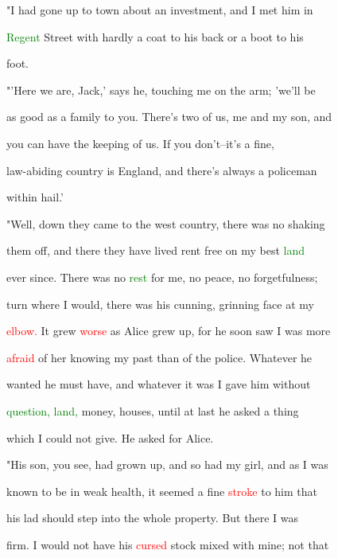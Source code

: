  "I had gone up to town about an investment, and I met him in

 \textcolor{green}{Regent} Street with hardly a coat to his back or a boot to his

 foot.



 "'Here we are, Jack,' says he, touching me on the arm; 'we'll be

 as \textcolor{BurntOrange}{good} as a family to you. There's two of us, me and my son, and

 you can have the keeping of us. If you don't--it's a fine,

 law-abiding country is England, and there's always a \textcolor{BurntOrange}{policeman}

 within \textcolor{BurntOrange}{hail.'}



 "Well, down they came to the west country, there was no shaking

 them off, and there they have lived rent free on my best \textcolor{green}{land}

 ever since. There was no \textcolor{green}{rest} for me, no \textcolor{BurntOrange}{peace,} no forgetfulness;

 turn where I would, there was his \textcolor{BurntOrange}{cunning,} \textcolor{BurntOrange}{grinning} face at my

 \textcolor{red}{elbow.} It \textcolor{BurntOrange}{grew} \textcolor{red}{worse} as Alice \textcolor{BurntOrange}{grew} up, for he soon saw I was more

 \textcolor{red}{afraid} of her knowing my past than of the \textcolor{BurntOrange}{police.} Whatever he

 wanted he must have, and whatever it was I gave him without

 \textcolor{green}{question,} \textcolor{green}{land,} \textcolor{BurntOrange}{money,} houses, until at last he asked a thing

 which I could not give. He asked for Alice.



 "His son, you see, had grown up, and so had my girl, and as I was

 known to be in weak health, it seemed a fine \textcolor{red}{stroke} to him that

 his lad should step into the whole property. But there I was

 firm. I would not have his \textcolor{red}{cursed} stock mixed with mine; not that

